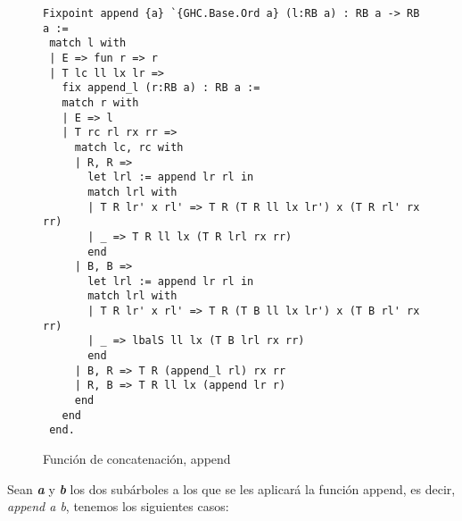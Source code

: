 \begin{figure}
\centering
\captionsetup{justification=centering}
\begin{verbatim}
Fixpoint append {a} `{GHC.Base.Ord a} (l:RB a) : RB a -> RB a :=
 match l with
 | E => fun r => r
 | T lc ll lx lr =>
   fix append_l (r:RB a) : RB a :=
   match r with
   | E => l
   | T rc rl rx rr =>
     match lc, rc with
     | R, R =>
       let lrl := append lr rl in
       match lrl with
       | T R lr' x rl' => T R (T R ll lx lr') x (T R rl' rx rr)
       | _ => T R ll lx (T R lrl rx rr)
       end
     | B, B =>
       let lrl := append lr rl in
       match lrl with
       | T R lr' x rl' => T R (T B ll lx lr') x (T B rl' rx rr)
       | _ => lbalS ll lx (T B lrl rx rr)
       end
     | B, R => T R (append_l rl) rx rr
     | R, B => T R ll lx (append lr r)
     end
   end
 end.
\end{verbatim}
\caption{Funci\'on de concatenaci\'on, append}
\label{func_app}
\end{figure}


Sean \textbf{\textit{a}} y \textbf{\textit{b}} los dos subárboles a los que se les aplicar\'a la funci\'on append, es decir,
\textit{append a b}, tenemos los siguientes casos:

